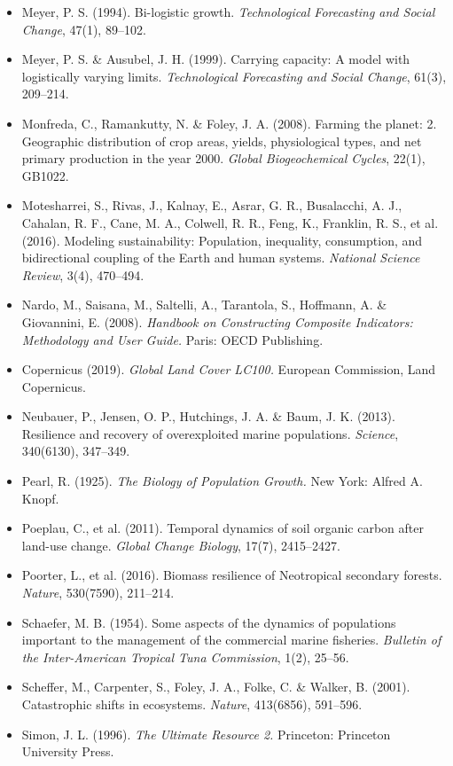 \documentclass[11pt]{article}
\begin{document}
\begin{itemize}
\item Meyer, P. S. (1994). Bi-logistic growth. \emph{Technological Forecasting and Social Change}, 47(1), 89--102.
\item Meyer, P. S. \& Ausubel, J. H. (1999). Carrying capacity: A model with logistically varying limits. \emph{Technological Forecasting and Social Change}, 61(3), 209--214.
\item Monfreda, C., Ramankutty, N. \& Foley, J. A. (2008). Farming the planet: 2. Geographic distribution of crop areas, yields, physiological types, and net primary production in the year 2000. \emph{Global Biogeochemical Cycles}, 22(1), GB1022.
\item Motesharrei, S., Rivas, J., Kalnay, E., Asrar, G. R., Busalacchi, A. J., Cahalan, R. F., Cane, M. A., Colwell, R. R., Feng, K., Franklin, R. S., et al. (2016). Modeling sustainability: Population, inequality, consumption, and bidirectional coupling of the Earth and human systems. \emph{National Science Review}, 3(4), 470--494.
\item Nardo, M., Saisana, M., Saltelli, A., Tarantola, S., Hoffmann, A. \& Giovannini, E. (2008). \emph{Handbook on Constructing Composite Indicators: Methodology and User Guide.} Paris: OECD Publishing.
\item Copernicus (2019). \emph{Global Land Cover LC100.} European Commission, Land Copernicus.
\item Neubauer, P., Jensen, O. P., Hutchings, J. A. \& Baum, J. K. (2013). Resilience and recovery of overexploited marine populations. \emph{Science}, 340(6130), 347--349.
\item Pearl, R. (1925). \emph{The Biology of Population Growth.} New York: Alfred A. Knopf.
\item Poeplau, C., et al. (2011). Temporal dynamics of soil organic carbon after land-use change. \emph{Global Change Biology}, 17(7), 2415--2427.
\item Poorter, L., et al. (2016). Biomass resilience of Neotropical secondary forests. \emph{Nature}, 530(7590), 211--214.
\item Schaefer, M. B. (1954). Some aspects of the dynamics of populations important to the management of the commercial marine fisheries. \emph{Bulletin of the Inter-American Tropical Tuna Commission}, 1(2), 25--56.
\item Scheffer, M., Carpenter, S., Foley, J. A., Folke, C. \& Walker, B. (2001). Catastrophic shifts in ecosystems. \emph{Nature}, 413(6856), 591--596.
\item Simon, J. L. (1996). \emph{The Ultimate Resource 2.} Princeton: Princeton University Press.

\end{itemize}
\end{document}
